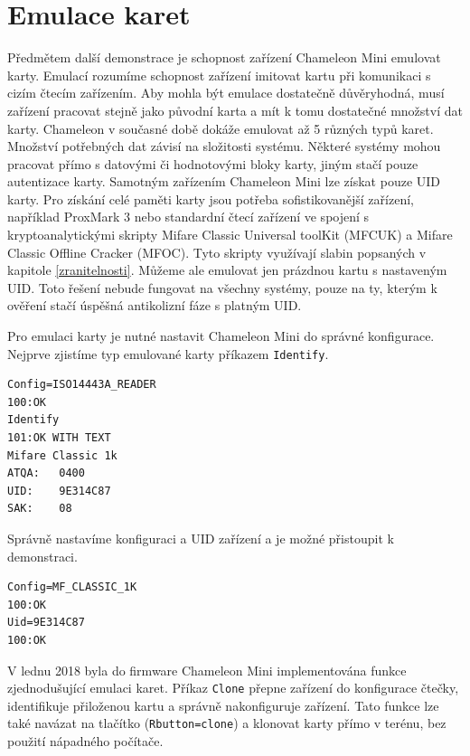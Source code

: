 \section{Emulace karet}
Předmětem další demonstrace je schopnost zařízení Chameleon Mini emulovat karty. Emulací rozumíme schopnost zařízení imitovat kartu při komunikaci s cizím čtecím zařízením. Aby mohla být emulace dostatečně důvěryhodná, musí zařízení pracovat stejně jako původní karta a mít k tomu dostatečné množství dat karty. Chameleon v současné době dokáže emulovat až 5 různých typů karet. Množství potřebných dat závisí na složitosti systému. Některé systémy mohou pracovat přímo s datovými či hodnotovými bloky karty, jiným stačí pouze autentizace karty. Samotným zařízením Chameleon Mini lze získat pouze UID karty. Pro získání celé paměti karty jsou potřeba sofistikovanější zařízení, například ProxMark 3 nebo standardní čtecí zařízení ve spojení s kryptoanalytickými skripty Mifare Classic Universal toolKit (MFCUK) a Mifare Classic Offline Cracker (MFOC)\cite{RelayUtokBP}. Tyto skripty využívají slabin popsaných v kapitole \ref{zranitelnosti}.
Můžeme ale emulovat jen prázdnou kartu s nastaveným UID. Toto řešení nebude fungovat na všechny systémy, pouze na ty, kterým k ověření stačí úspěšná antikolizní fáze s platným UID.\par
Pro emulaci karty je nutné nastavit Chameleon Mini do správné konfigurace. Nejprve zjistíme typ emulované karty příkazem \verb|Identify|.

\begin{lstlisting}[caption=Záznam postupu identifikace karty, label={ChameleonIdentify}]
Config=ISO14443A_READER
100:OK
Identify
101:OK WITH TEXT
Mifare Classic 1k
ATQA:   0400
UID:    9E314C87
SAK:    08
\end{lstlisting}

Správně nastavíme konfiguraci a UID zařízení a je možné přistoupit k demonstraci.

\begin{lstlisting}[caption=Záznam nastavení emulace karty, label={ChameleonSetting}]
Config=MF_CLASSIC_1K
100:OK
Uid=9E314C87
100:OK
\end{lstlisting}

V lednu 2018 byla do firmware Chameleon Mini implementována funkce zjednodušující emulaci karet. Příkaz \verb|Clone| přepne zařízení do konfigurace čtečky, identifikuje přiloženou kartu a správně nakonfiguruje zařízení. Tato funkce lze také navázat na tlačítko (\verb|Rbutton=clone|) a klonovat karty přímo v terénu, bez použití nápadného počítače.

